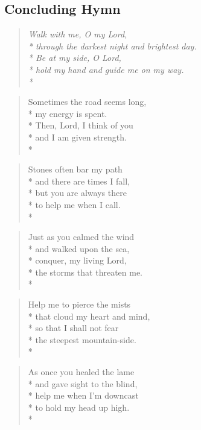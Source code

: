 \documentclass[12pt]{article}
\newcounter{count}
\newcommand\printcount{\addtocounter{count}{1}\thecount}
\begin{document}
\begin{center}
\subsection*{Concluding Hymn}
\end{center}
\begin{multicols}{2}
\setcounter{count}{0}
\setcounter{count}{0}
\begin{verse}
\textit{Walk with me, O my Lord,\\*
through the darkest night and brightest day.\\*
Be at my side, O Lord,\\*
hold my hand and guide me on my way.\\*}
\end{verse}

\begin{verse}
\flagverse{\printcount.} Sometimes the road seems long,\\*
my energy is spent.\\*
Then, Lord, I think of you\\*
and I am given strength.\\*
\end{verse}

\begin{verse}
\flagverse{\printcount.} Stones often bar my path\\*
and there are times I fall,\\*
but you are always there\\*
to help me when I call.\\*
\end{verse}

\begin{verse}
\flagverse{\printcount.} Just as you calmed the wind\\*
and walked upon the sea,\\*
conquer, my living Lord,\\*
the storms that threaten me.\\*
\end{verse}

\begin{verse}
\flagverse{\printcount.} Help me to pierce the mists\\*
that cloud my heart and mind,\\*
so that I shall not fear\\*
the steepest mountain-side.\\*
\end{verse}

\begin{verse}
\flagverse{\printcount.} As once you healed the lame\\*
and gave sight to the blind,\\*
help me when I'm downcast\\*
to hold my head up high.\\*
\end{verse}
\end{multicols}
\end{document}
